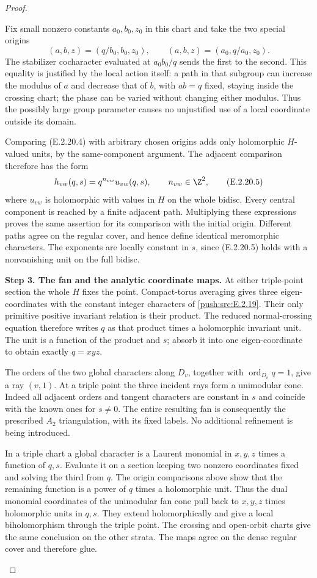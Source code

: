 \begin{proof}
\begin{enumerate}[label={$\langle1\rangle$\arabic*.},leftmargin=*]
Fix small nonzero constants
$a_0,b_0,z_0$ in this chart
and take the two special
origins
\[
 (a,b,z)=(q/b_0,b_0,z_0),\qquad
 (a,b,z)=(a_0,q/a_0,z_0).
 \tag{E.2.20.4}
\]
The stabilizer cocharacter
evaluated at $a_0b_0/q$
sends the first to the
second.  This equality
is justified by the local
action itself: a path
in that subgroup can
increase the modulus of
$a$ and decrease that
of $b$, with $ab=q$
fixed, staying inside
the crossing chart;
the phase can be varied
without changing either
modulus.  Thus the
possibly large group
parameter causes no
unjustified use of a
local coordinate outside
its domain.

Comparing (E.2.20.4) with
arbitrary chosen origins
adds only holomorphic
$H$-valued units, by the
same-component argument.
The adjacent comparison
therefore has the form
\[
 h_{vw}(q,s)=q^{n_{vw}}u_{vw}(q,s),
 \qquad n_{vw}\in\Z^2,
 \tag{E.2.20.5}
\]
where $u_{vw}$ is holomorphic
with values in $H$ on the
whole bidisc.  Every central
component is reached by
a finite adjacent path.
Multiplying these expressions
proves the same assertion
for its comparison with
the initial origin.
Different paths agree
on the regular cover,
and hence define identical
meromorphic characters.
The exponents are locally
constant in $s$, since
(E.2.20.5) holds with a
nonvanishing unit on the
full bidisc.

\noindent\textbf{Step 3. The fan and the analytic coordinate maps.}
At either triple-point
section the whole $H$
fixes the point.
Compact-torus averaging
gives three eigen-coordinates
with the constant integer
characters of \ref{push:src:E.2.19}.
Their only primitive
positive invariant relation
is their product.
The reduced normal-crossing
equation therefore writes
$q$ as that product times
a holomorphic invariant
unit.  The unit is a
function of the product
and $s$; absorb it into
one eigen-coordinate to
obtain exactly $q=xyz$.

The orders of the two
global characters along
$D_v$, together with
$\operatorname{ord}_{D_v}q=1$,
give a ray $(v,1)$.
At a triple point the
three incident rays
form a unimodular cone.
Indeed all adjacent
orders and tangent
characters are constant
in $s$ and coincide
with the known ones
for $s\ne0$.
The entire resulting
fan is consequently
the prescribed $A_2$
triangulation, with
its fixed labels.
No additional refinement
is being introduced.

In a triple chart a
global character is
a Laurent monomial in
$x,y,z$ times a function
of $q,s$.  Evaluate it
on a section keeping
two nonzero coordinates
fixed and solving the
third from $q$.
The origin comparisons
above show that the
remaining function is
a power of $q$ times
a holomorphic unit.
Thus the dual monomial
coordinates of the
unimodular fan cone
pull back to $x,y,z$
times holomorphic units
in $q,s$.  They extend
holomorphically and
give a local
biholomorphism through
the triple point.
The crossing and
open-orbit charts give
the same conclusion
on the other strata.
The maps agree on
the dense regular
cover and therefore
glue.


\end{enumerate}
\end{proof}

